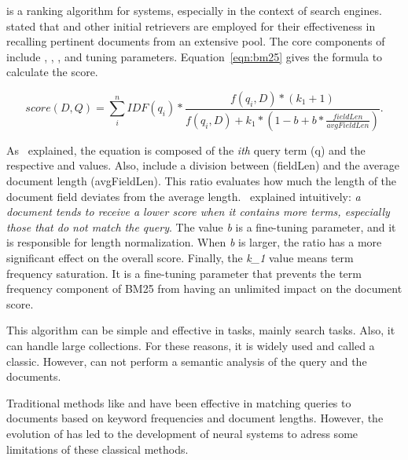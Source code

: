 {\bm} is a ranking algorithm for {\ir} systems, especially in the context of search engines.~\citet{hambarde_information_2023} stated that {\bm} and other initial retrievers are employed for their effectiveness in recalling pertinent documents from an extensive pool. The core components of {\bm} include {\tf}, {\idf}, {\dl}, and tuning parameters. Equation~\ref{eqn:bm25} gives the formula to calculate the {\bm} score.

\begin{equation}
score(D,Q) = \sum_{i}^{n} IDF(q_{i}) \ast \frac{f(q_{i},D) \ast (k_1 + 1)}{f(q_{i},D) + k_1 \ast (1 - b + b \ast \frac{fieldLen}{avgFieldLen})}.
\label{eqn:bm25}
\end{equation}

As~\citet{phd_understanding_2023} explained, the {\bm} equation is composed of the \textit{ith} query term (q) and the respective {\idf} and {\tf} values. Also, include a division between {\dl} (fieldLen) and the average document length (avgFieldLen). This ratio evaluates how much the length of the document field deviates from the average length.~\citet{noauthor_practical_2018} explained intuitively: \textit{a document tends to receive a lower score when it contains more terms, especially those that do not match the query}. The value \textit{b} is a fine-tuning parameter, and it is responsible for length normalization. When \textit{b} is larger, the ratio has a more significant effect on the overall score. Finally, the \textit{k_1} value means term frequency saturation. It is a fine-tuning parameter that prevents the term frequency component of BM25 from having an unlimited impact on the document score.

This algorithm can be simple and effective in {\ir} tasks, mainly search tasks. Also, it can handle large collections. For these reasons, it is widely used and called a classic. However, {\bm} can not perform a semantic analysis of the query and the documents.



Traditional {\ir} methods like {\tfidf} and {\bm} have been effective in matching queries to documents based on keyword frequencies and document lengths. However, the evolution of {\ai} has led to the development of neural {\ir} systems to adress some limitations of these classical methods.




